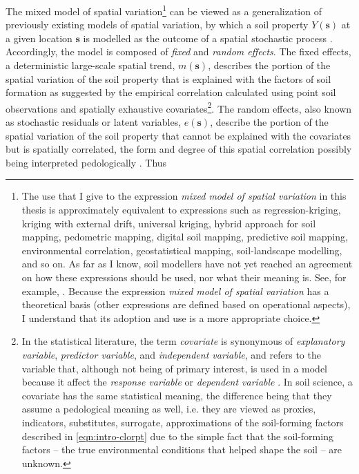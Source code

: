 The mixed model of spatial variation\footnote{The use that I give to the expression \emph{mixed model of 
spatial variation}
in this thesis is approximately equivalent to expressions such as regression-kriging, kriging with external 
drift, universal
kriging, hybrid approach for soil mapping, pedometric mapping, digital soil mapping, predictive soil mapping, 
environmental
correlation, geostatistical mapping, soil-landscape modelling, and so on. As far as I know, soil modellers have 
not yet reached an agreement on how these  expressions should be used, nor what their 
 meaning is. See, for example, . Because the 
expression \emph{mixed model of spatial variation} has a theoretical basis (other expressions are defined based 
on operational aspects), I understand that its adoption and use is a more appropriate choice.} can be viewed as 
a generalization of previously existing models of spatial variation, by which a soil property 
$Y(\boldsymbol{s})$ at a given location $\boldsymbol{s}$ is modelled as the outcome of a spatial stochastic 
process \cite{Cressie1993, HeuvelinkEtAl2001, LarkEtAl2006}. Accordingly, the model is composed of \emph{fixed} 
and \emph{random effects}. The fixed effects, a deterministic large-scale spatial trend, $m(\boldsymbol{s})$, 
describes the portion of the spatial variation of the soil property that is explained with the factors of soil 
formation as suggested by the empirical correlation calculated using point soil observations and spatially 
exhaustive covariates\footnote{In the statistical literature, the term \emph{covariate} is synonymous of 
\emph{explanatory variable}, \emph{predictor variable}, and \emph{independent variable}, and refers to the 
variable that, although not being of primary interest, is used in a model because it affect the \emph{response 
variable} or \emph{dependent variable} \cite{Everitt2006}. In soil science, a covariate has the same 
statistical meaning, the difference being that they assume a pedological meaning as well, i.e. they are viewed 
as proxies, indicators, substitutes, surrogate, approximations of the soil-forming factors described in 
\autoref{eqn:intro-clorpt} due to the simple fact that the soil-forming factors -- the true environmental 
conditions that helped shape the soil -- are unknown.}. The random effects, also known as stochastic residuals 
or latent variables, $e(\boldsymbol{s})$, describe the portion of the spatial variation of the soil property 
that cannot be explained with the covariates but is spatially correlated, the form and degree of this spatial 
correlation possibly being interpreted pedologically \cite{Lark2012}. Thus

